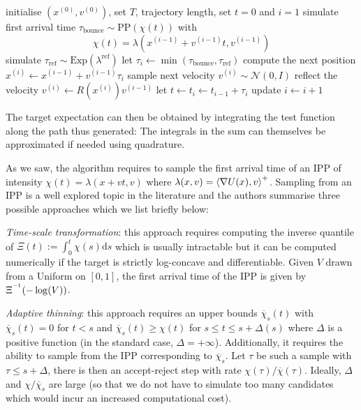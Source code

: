 \begin{algorithm}[!h]\small
	\caption{\label{alg:BPS1}\small {}}
	\begin{algorithmic}[1]
	\State initialise $(x^{(0)},v^{(0)})$, set $T$, trajectory length, set $t=0$ and $i=1$
		\State simulate first arrival time $\tau_{\text{bounce}} \sim \text{PP}(\chi(t))$  with
		$$ \chi(t) = \lambda(x^{(i-1)}+v^{(i-1)}t,v^{(i-1)})$$
		\State simulate $\tau_{\text{ref}}\sim \mathrm{Exp}(\lambda^{\text{ref}})$
		\State let $\tau_{i}\leftarrow \min(\tau_{\text{bounce}},\tau_{\text{ref}})$
		\State compute the next position $x^{(i)}\leftarrow x^{(i-1)}+v^{(i-1)}\tau_{i}$
			\State sample next velocity $v^{(i)}\sim \mathcal N(0,I)$		
			\State reflect the velocity $v^{(i)}\leftarrow R(x^{(i)})v^{(i-1)}$
		\EndIf
		\State let $t\leftarrow t_{i}\leftarrow t_{i-1}+\tau_{i}$
		\State update $i\leftarrow i+1$
	\EndWhile
	\end{algorithmic}
\end{algorithm}

The target expectation can then be obtained by integrating the test function along the path thus generated:
The integrals in the sum can themselves be approximated if needed using quadrature.

As we saw, the algorithm requires to sample the first arrival time of an IPP of intensity $\chi(t)=\lambda(x+vt,v)$ where $\lambda(x,v)=\left\langle \nabla U(x),v \right\rangle^{+}$. Sampling from an IPP is a well explored topic in the literature and the authors summarise three possible approaches which we list briefly below:

    \emph{Time-scale transformation}: this approach requires computing the inverse quantile of $\Xi(t):=\int_{0}^{t} \chi(s)\mathrm{d}s$ which is usually intractable but it can be computed numerically if the target is strictly log-concave and differentiable. Given $V$ drawn from a Uniform on $[0,1]$, the first arrival time of the IPP is given by $\Xi^{^{-1}}(-\log(V))$.
    
    \emph{Adaptive thinning}: this approach requires an upper bounds $\overline{\chi}_{s}(t)$ with $\overline\chi_{s}(t)=0$ for $t<s$ and $\overline\chi_{s}(t)\ge\chi(t)$ for $s\le t\le s+\Delta(s)$ where $\Delta$ is a positive function (in the standard case, $\Delta=+\infty$). Additionally, it requires the ability to sample from the IPP corresponding to $\overline\chi_{s}$. Let $\tau$ be such a sample with $\tau\le s+\Delta$, there is then an accept-reject step with rate $\chi(\tau)/\overline\chi(\tau)$. Ideally, $\Delta$ and $\chi/\overline\chi_{s}$ are large (so that we do not have to simulate too many candidates which would incur an increased computational cost).
 
